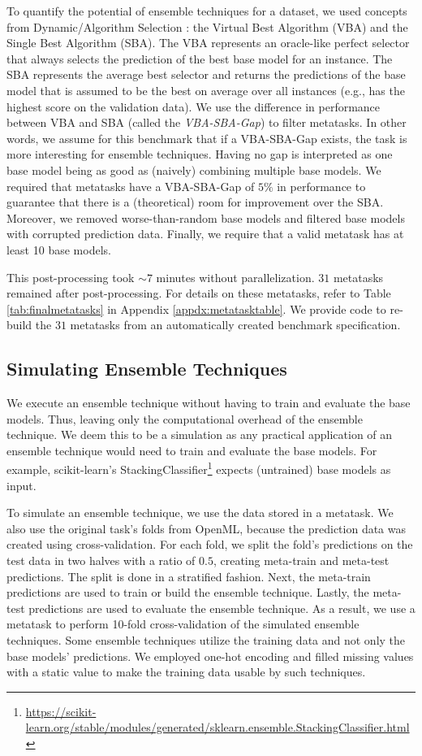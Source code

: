 \documentclass[11pt]{article}
\begin{document}
To quantify the potential of ensemble techniques for a dataset, we used concepts from Dynamic/Algorithm Selection \citep{cruz2018dynamic,DBLP:journals/ec/KerschkeHNT19}: the Virtual Best Algorithm (VBA) and the Single Best Algorithm (SBA). The VBA represents an oracle-like perfect selector that always selects the prediction of the best base model for an instance. The SBA represents the average best selector and returns the predictions of the base model that is assumed to be the best on average over all instances (e.g., has the highest score on the validation data). 
We use the difference in performance between VBA and SBA (called the \textit{VBA-SBA-Gap}) to filter metatasks. 
In other words, we assume for this benchmark that if a VBA-SBA-Gap exists, the task is more interesting for ensemble techniques. Having no gap is interpreted as one base model being as good as (naively) combining multiple base models. 
We required that metatasks have a VBA-SBA-Gap of $5\%$ in performance to guarantee that there is a (theoretical) room for improvement over the SBA. 
Moreover, we removed worse-than-random base models and filtered base models with corrupted prediction data.
Finally, we require that a valid metatask has at least 10 base models. 

This post-processing took ${\sim} 7$ minutes without parallelization. $31$ metatasks remained after post-processing. 
For details on these metatasks, refer to Table \ref{tab:finalmetatasks} in Appendix \ref{appdx:metatasktable}. 
We provide code to re-build the $31$ metatasks from an automatically created benchmark specification.

\subsection{Simulating Ensemble Techniques}
\label{sec:simulate}
We execute an ensemble technique without having to train and evaluate the base models. Thus, leaving only the computational overhead of the ensemble technique.
We deem this to be a simulation as any practical application of an ensemble technique would need to train and evaluate the base models. For example, scikit-learn's StackingClassifier\footnote{\url{https://scikit-learn.org/stable/modules/generated/sklearn.ensemble.StackingClassifier.html}} expects (untrained) base models as input. 

To simulate an ensemble technique, we use the data stored in a metatask. 
We also use the original task's folds from OpenML, because the prediction data was created using cross-validation.
For each fold, we split the fold's predictions on the test data in two halves with a ratio of $0.5$, creating meta-train and meta-test predictions. The split is done in a stratified fashion. 
Next, the meta-train predictions are used to train or build the ensemble technique. Lastly, the meta-test predictions are used to evaluate the ensemble technique.
As a result, we use a metatask to perform 10-fold cross-validation of the simulated ensemble techniques. 
Some ensemble techniques utilize the training data and not only the base models' predictions. We employed one-hot encoding and filled missing values with a static value to make the training data usable by such techniques.  
\end{document}
